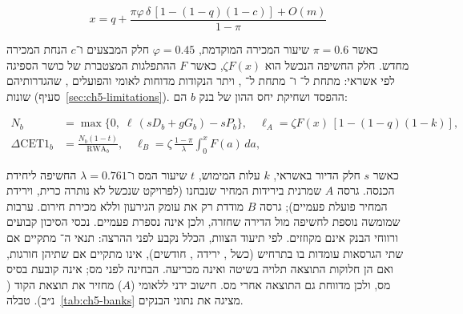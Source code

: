 \begin{equation}
x=q+\frac{\pi\varphi\,\delta\,[1-(1-q)(1-c)]+O(m)}{1-\pi}
\label{eq:ch5-erosion}
\end{equation}

כאשר $\pi=0.6$ שיעור המכירה המוקדמת, $\varphi=0.45$ חלק המבצעים ו־$c$ הנחת המכירה מחדש. חלק החשיפה הנכשל הוא $\zeta F(x)$, כאשר $F$ ההתפלגות המצטברת של כושר הספיגה לפי אשראי:  מתחת ל־ ו־ מתחת ל־ \cite{boi_survey2025}, ויתר הנקודות מדוחות לאומי והפועלים \cite{leumi_q3_2026,hapoalim_q3_2026}, שהגדרותיהם שונות (סעיף~\ref{sec:ch5-limitations}). ההפסד ושחיקת יחס ההון של בנק $b$ הם:

\begin{align}
N_b &= \max\{0,\; \ell\,(sD_b+gG_b)-sP_b\}, \quad \ell_A = \zeta F(x)\,[1-(1-q)(1-k)], \label{eq:ch5-loss}\\
\Delta\mathrm{CET1}_b &= \frac{N_b(1-t)}{\mathrm{RWA}_b}, \quad \ell_B = \zeta\,\frac{1-\pi}{\lambda}\int_0^{x}F(a)\,da, \label{eq:ch5-cet1}
\end{align}

כאשר $s$ חלק הדיור באשראי, $k$ עלות המימוש, $t$ שיעור המס ו־$\lambda=0.761$ החשיפה ליחידת הכנסה. גרסה $A$ שמרנית בירידות המחיר שנבחנו (לפרויקט שנכשל לא נותרה כרית, וירידת המחיר פועלת פעמיים); גרסה $B$ מודדת רק את עומק הגירעון וללא מכירת חירום. ערבות שמומשה נוספת לחשיפה מול הדירה שחזרה, ולכן אינה נספרת פעמיים. נכסי הסיכון קבועים ורווחי הבנק אינם מקוזזים. לפי תיעוד הצוות, הכלל נקבע לפני ההרצה: תנאי ה־ מתקיים אם שתי הגרסאות עומדות בו בתרחיש (כשל , ירידה ,  חודשים), אינו מתקיים אם שתיהן חורגות, ואם הן חלוקות התוצאה תלויה בשיטה ואינה מכריעה. הבחינה לפני מס; \mbox{} אינה קובעת בסיס מס, ולכן מדווחת גם התוצאה אחרי מס. חישוב ידני ללאומי ($A$) מחזיר את תוצאת הקוד ( נ״ב). טבלה~\ref{tab:ch5-banks} מציגה את נתוני הבנקים.

